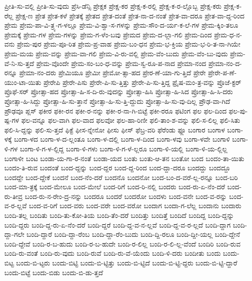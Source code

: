 {ಪ್ರೀತಿ-ಸು-ವಲ್ಲಿ
ಪ್ರೀತಿ-ಸು-ವುದು
ಪ್ರೆಸಿ-ಡೆನ್ಸಿ
ಪ್ರೇಕ್ಷಕ
ಪ್ರೇಕ್ಷ-ಕರ
ಪ್ರೇಕ್ಷ-ಕ-ರಲ್ಲಿ
ಪ್ರೇಕ್ಷ-ಕ-ರ-ಲ್ಲೊಬ್ಬ
ಪ್ರೇಕ್ಷ-ಕರು
ಪ್ರೇಕ್ಷ-ಕ-ರೆಲ್ಲ
ಪ್ರೇಕ್ಷ-ಣ
ಪ್ರೇತ
ಪ್ರೇತ-ಕಳೆ
ಪ್ರೇತಕ್ಕೆ
ಪ್ರೇತದ
ಪ್ರೇತ-ದಂತೆ
ಪ್ರೇತ-ನಾ-ದ-ನಂತೆ
ಪ್ರೇತ-ವಾ-ದರೂ
ಪ್ರೇತ-ವಾ-ದ್ದ-ರಿಂದ
ಪ್ರೇಮ
ಪ್ರೇಮ-ಪಾ-ವಿ-ತ್ರ್ಯ-ಗ-ಳಲ್ಲೂ
ಪ್ರೇಮ-ವಿ-ಶ್ವಾ-ಸ-ಗಳನ್ನು
ಪ್ರೇಮ-ಸೌಂ-ದ-ರ್ಯ-ಕ-ಲೆ-ಗಳ
ಪ್ರೇಮ-ಕ್ಕಿಂ-ತಲೂ
ಪ್ರೇಮಕ್ಕೆ
ಪ್ರೇಮ-ಗಳ
ಪ್ರೇಮ-ಗಳನ್ನು
ಪ್ರೇಮ-ಗ-ಳೆಂ-ಬವು
ಪ್ರೇಮದ
ಪ್ರೇಮ-ದ-ಲ್ಲಾ-ಗಲಿ
ಪ್ರೇಮ-ದಿಂದ
ಪ್ರೇಮ-ಧ-ನ-ವನು
ಪ್ರೇಮ-ಪುರ
ಪ್ರೇಮ-ಪೂ-ರಿತ
ಪ್ರೇಮ-ಪ್ರ-ವಾಹ
ಪ್ರೇಮ-ಬಂ-ಧನ
ಪ್ರೇಮ-ಭ-ಕ್ತಿಯ
ಪ್ರೇಮ-ಭ-ರಿ-ತ-ನಾ-ಗಿಯೇ
ಪ್ರೇಮ-ಮಯ
ಪ್ರೇಮ-ವನ್ನು
ಪ್ರೇಮ-ವಾ-ಗಲಿ
ಪ್ರೇಮ-ವಿ-ರು-ವಲ್ಲಿ
ಪ್ರೇಮ-ವೆಂ-ಬುದು
ಪ್ರೇಮ-ವೆಂ-ಬು-ವುದು
ಪ್ರೇಮ-ವೆ-ನಿ-ಸು-ತ್ತದೆ
ಪ್ರೇಮ-ವೊಂದೇ
ಪ್ರೇಮ-ಸಂ-ಬಂ-ಧ-ವನ್ನು
ಪ್ರೇಮ-ಸ್ವ-ರೂ-ಪ-ನಾದ
ಪ್ರೇಮಾ-ನಂದ
ಪ್ರೇಮಾ-ನಂ-ದ-ರನ್ನೂ
ಪ್ರೇಮಾ-ನಂ-ದರು
ಪ್ರೇಮಿಯೂ
ಪ್ರೇಮೀ
ಪ್ರೇಮೋ-ತ್ಸಾ-ಹದ
ಪ್ರೇರ-ಣೆ-ಯಾ-ಗು-ತ್ತಿದೆ
ಪ್ರೇರೇ
ಪ್ರೇರೇ-ಪ-ಣೆ-ಯುಂ-ಟಾ-ಯಿತು
ಪ್ರೇರೇಪಿ
ಪ್ರೇರೇ-ಪಿಸು
ಪ್ರೇರೇ-ಪಿ-ಸು-ತ್ತಿತ್ತು
ಪ್ರೇರೇ-ಪಿ-ಸು-ತ್ತಿದ್ದ
ಪ್ರೈಷ-ಮಂ-ತ್ರ-ವನ್ನು
ಪ್ರೊಜೆ-ಕ್ಟರ್
ಪ್ರೊಫೆ-ಸರ್
ಪ್ರೋತ್ಸಾ-ಹದ
ಪ್ರೋತ್ಸಾ-ಹಿ-ಸ-ದಿ-ರು-ವುದನ್ನು
ಪ್ರೋತ್ಸಾ-ಹಿಸಿ
ಪ್ರೋತ್ಸಾ-ಹಿ-ಸಿದ
ಪ್ರೋತ್ಸಾ-ಹಿ-ಸಿ-ದರು
ಪ್ರೋತ್ಸಾ-ಹಿ-ಸಿದ್ದು
ಪ್ರೋತ್ಸಾ-ಹಿ-ಸು-ತ್ತಾನೆ
ಪ್ರೋತ್ಸಾ-ಹಿ-ಸು-ತ್ತಿ-ದ್ದುದು
ಪ್ರೋತ್ಸಾ-ಹಿ-ಸು-ವು-ದಿಲ್ಲ
ಪ್ರೌಢ-ವಾ-ಗಿದೆ
ಪ್ರೌಢವೂ
ಪ್ಲಸ್
ಫಕೀರ
ಫಕೀ-ರನ
ಫಕೀ-ರ-ನನ್ನು
ಫಕೀ-ರ-ನಾ-ಗಿ-ಬಿಟ್ಟೆ
ಫಕೀ-ರರೂ
ಫಟಿಂಗ
ಫಲ
ಫಲ-ದಿಂದ
ಫಲ-ಪು-ಷ್ಪ-ಗಳ
ಫಲ-ವನ್ನೂ
ಫಲ-ವಾಗಿ
ಫಲ-ವಾದ
ಫಲವೋ
ಫಲ-ಹಾ-ರಿಣೀ
ಫಲಿ-ತಾಂ-ಶ-ವನ್ನು
ಫಲಿ-ಸ-ಲಿಲ್ಲ
ಫಲಿ-ಸಿತು
ಫಲಿ-ಸಿ-ದ್ದನ್ನು
ಫಲಿ-ಸು-ತ್ತದೆ
ಫಿಕ್ಟೆ
ಫೀಸ-ನ್ನೇನೋ
ಫೀಸು
ಫೀಸ್
ಫೆಬ್ರ-ವರಿ
ಫೆರೆಂಡು
ಫ್ಲೂ
ಬಂಗಾರ
ಬಂಗಾಳ
ಬಂಗಾ-ಳಕ್ಕೆ
ಬಂಗಾ-ಳದ
ಬಂಗಾ-ಳ-ದ-ಲ್ಲಂತೂ
ಬಂಗಾ-ಳ-ದಲ್ಲಿ
ಬಂಗಾ-ಳ-ದಿಂದ
ಬಂಗಾ-ಳವು
ಬಂಗಾ-ಳವೇ
ಬಂಗಾಳಿ
ಬಂಗಾ-ಳಿ-ಗಳ
ಬಂಗಾ-ಳಿ-ಗ-ಳ-ಲ್ಲಿದ್ದ
ಬಂಗಾ-ಳಿ-ಗಳು
ಬಂಗಾ-ಳಿ-ಗ-ಳೆ-ಲ್ಲರೂ
ಬಂಗಾ-ಳಿ-ಯಲ್ಲಿ
ಬಂಗಾ-ಳಿ-ಯ-ಲ್ಲಿಲ್ಲ
ಬಂಗಾಳೀ
ಬಂಟ
ಬಂಡಾ-ಯ-ಗಾ-ರ-ನಂತೆ
ಬಂಡಾ-ಯದ
ಬಂತು
ಬಂತು-ಆ-ತನ
ಬಂತೋ
ಬಂದ
ಬಂದಂ-ತಾ-ಯಿತು
ಬಂದಂ-ತಿ-ರುವ
ಬಂದಂತೆ
ಬಂದ-ದ್ದನ್ನು
ಬಂದ-ದ್ದರ
ಬಂದ-ದ್ದ-ರಿಂದ
ಬಂದ-ದ್ದಾ-ದರೂ
ಬಂದದ್ದು
ಬಂದದ್ದೂ
ಬಂದದ್ದೇ
ಬಂದ-ದ್ದೇಕೆ
ಬಂದನೆ
ಬಂದ-ನೆಂ-ದರೆ
ಬಂದನೊ
ಬಂದನೋ
ಬಂದ-ಬಂ-ದ-ವರೆ-ಲ್ಲ-ರನ್ನೂ
ಬಂದ-ಬರಿ
ಬಂದ-ಮಾ-ತ್ರಕ್ಕೆ
ಬಂದ-ಮೇಲೂ
ಬಂದ-ಮೇಲೆ
ಬಂದ-ರಿಗೆ
ಬಂದ-ರಿ-ನಲ್ಲಿ
ಬಂದರು
ಬಂದ-ರು-ಏ-ನೆಂ-ದರೆ
ಬಂದ-ರು-ತೀವ್ರ
ಬಂದ-ರು-ನ-ರೇಂ-ದ್ರ-ನನ್ನು
ಬಂದರೂ
ಬಂದರೆ
ಬಂದರೋ
ಬಂದಳು
ಬಂದ-ವನೇ
ಬಂದ-ವ-ರನ್ನು
ಬಂದ-ವ-ರ-ಲ್ಲವೆ
ಬಂದ-ವ-ರಿಗೆ
ಬಂದ-ವರು
ಬಂದ-ವರೇ
ಬಂದ-ವರೋ
ಬಂದಾಗ
ಬಂದಾ-ಗ-ಲೆಲ್ಲ
ಬಂದಾನು
ಬಂದಾರು
ಬಂದಿ-ತಲ್ಲ
ಬಂದಿತು
ಬಂದಿ-ತು-ಕೋ-ತಿಯ
ಬಂದಿ-ತೆಂ-ದರೆ
ಬಂದಿತ್ತು
ಬಂದಿತ್ತೆ
ಬಂದಿದೆ
ಬಂದಿದ್ದ
ಬಂದಿ-ದ್ದನ್ನು
ಬಂದಿ-ದ್ದರು
ಬಂದಿ-ದ್ದ-ರು-ಏ-ನೆಂ-ದರೆ
ಬಂದಿ-ದ್ದರೆ
ಬಂದಿ-ದ್ದ-ವ-ನ-ಲ್ಲವೆ
ಬಂದಿ-ದ್ದ-ವ-ರ-ಲ್ಲದೆ
ಬಂದಿ-ದ್ದಾಗ
ಬಂದಿ-ದ್ದಾ-ಗಲೇ
ಬಂದಿ-ದ್ದಾರೆ
ಬಂದಿ-ದ್ದಾ-ರೆಂಬ
ಬಂದಿ-ದ್ದಾ-ರೆಂ-ಬುದು
ಬಂದಿ-ದ್ದಿ-ರಲೂ
ಬಂದಿ-ದ್ದೀ-ಯಲ್ಲ
ಬಂದಿ-ದ್ದೇನೆ
ಬಂದಿ-ದ್ದೇವೆ
ಬಂದಿ-ರ-ಬ-ಹುದು
ಬಂದಿ-ರ-ಬ-ಹುದೇ
ಬಂದಿ-ರ-ಲಿಲ್ಲ
ಬಂದಿ-ರ-ಲಿ-ಲ್ಲ-ವೆಂದೆ
ಬಂದಿರಿ
ಬಂದಿ-ರುವ
ಬಂದಿ-ರು-ವಂತೆ
ಬಂದಿ-ರು-ವುದು
ಬಂದಿ-ರುವೆ
ಬಂದಿ-ರು-ವೆ-ಯೆಂದು
ಬಂದಿ-ಳಿ-ದರು
ಬಂದೀತು
ಬಂದು
ಬಂದು-ಬಿಟ್ಟ
ಬಂದು-ಬಿ-ಟ್ಟರು
ಬಂದು-ಬಿಟ್ಟಿ
ಬಂದು-ಬಿ-ಟ್ಟಿತ್ತು
ಬಂದು-ಬಿ-ಟ್ಟಿದೆ
ಬಂದು-ಬಿ-ಟ್ಟಿ-ದ್ದರು
ಬಂದು-ಬಿ-ಟ್ಟಿ-ದ್ದಾರೆ
ಬಂದು-ಬಿಟ್ಟೆ
ಬಂದು-ಬಿಡು
ಬಂದು-ಬಿ-ಡು-ತ್ತದೆ
}
